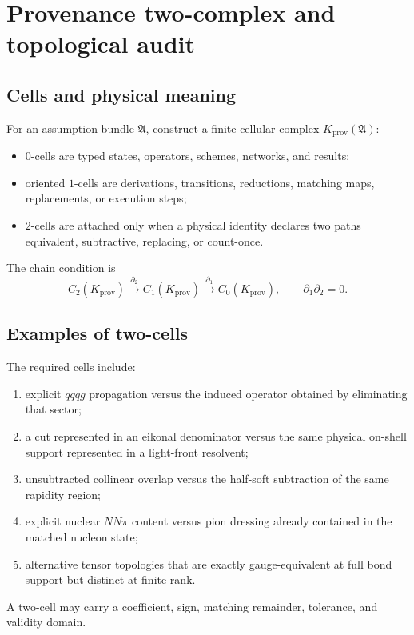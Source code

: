 \documentclass[11pt]{article}
\newcommand{\Aset}{\mathfrak A}
\newcommand{\Kprov}{K_{\mathrm{prov}}}
\begin{document}
\section{Provenance two-complex and topological audit}
\label{sec:provenance-complex}

\subsection{Cells and physical meaning}

For an assumption bundle \(\Aset\), construct a finite cellular complex
\(\Kprov(\Aset)\):
\begin{itemize}
 \item \(0\)-cells are typed states, operators, schemes, networks, and results;
 \item oriented \(1\)-cells are derivations, transitions, reductions,
 matching maps, replacements, or execution steps;
 \item \(2\)-cells are attached only when a physical identity declares two
 paths equivalent, subtractive, replacing, or count-once.
\end{itemize}
The chain condition is
\begin{equation}
 C_2(\Kprov)
 \xrightarrow{\partial_2}
 C_1(\Kprov)
 \xrightarrow{\partial_1}
 C_0(\Kprov),
 \qquad
 \partial_1\partial_2=0.
\label{eq:prov-chain}
\end{equation}

\subsection{Examples of two-cells}

The required cells include:
\begin{enumerate}
 \item explicit \(qqqg\) propagation versus the induced operator obtained by
 eliminating that sector;
 \item a cut represented in an eikonal denominator versus the same physical
 on-shell support represented in a light-front resolvent;
 \item unsubtracted collinear overlap versus the half-soft subtraction of the
 same rapidity region;
 \item explicit nuclear \(NN\pi\) content versus pion dressing already
 contained in the matched nucleon state;
 \item alternative tensor topologies that are exactly gauge-equivalent at full
 bond support but distinct at finite rank.
\end{enumerate}
A two-cell may carry a coefficient, sign, matching remainder, tolerance, and
validity domain.
\end{document}
